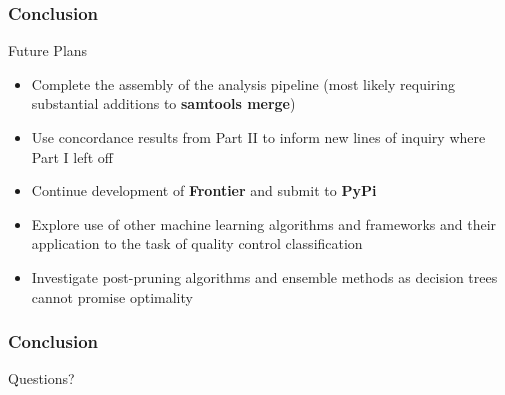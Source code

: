\documentclass{beamer}
\begin{document}
\begin{frame}[t]
    \frametitle{Conclusion}
    \begin{beamerboxesrounded}[shadow=true]{}
        \begin{center}
            Future Plans
        \end{center}
    \end{beamerboxesrounded}
    \begin{itemize}
        \item Complete the assembly of the analysis pipeline (most likely requiring
            substantial additions to \textbf{samtools merge})
        \item Use concordance results from Part II to inform new lines of inquiry
            where Part I left off
        \item Continue development of \textbf{Frontier} and submit to \textbf{PyPi}
        \item Explore use of other machine learning algorithms and frameworks and
            their application to the task of quality control classification
        \item Investigate post-pruning algorithms and ensemble methods as decision
            trees cannot promise optimality
    \end{itemize}
\end{frame}

\begin{frame}[t]
    \frametitle{Conclusion}
    \vskip 2.5cm
    \begin{beamerboxesrounded}[shadow=true]{}
        \begin{center}
            Questions?
        \end{center}
    \end{beamerboxesrounded}
\end{frame}
\end{document}

